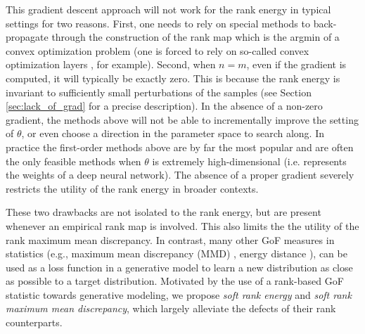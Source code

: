 \documentclass{article}
\theoremstyle{definition}
\begin{document}
This gradient descent approach will not work for the rank energy in typical settings for two reasons. First, one needs to rely on special methods to back-propagate through the construction of the rank map which is the argmin of a convex optimization problem (one is forced to rely on so-called convex optimization layers \cite{agrawal2019differentiable}, for example). Second, when $n = m$, even if the gradient is computed, it will typically be exactly zero. This is because the rank energy is invariant to sufficiently small perturbations of the samples (see Section \ref{sec:lack_of_grad} for a precise description). In the absence of a non-zero gradient, the methods above will not be able to incrementally improve the setting of $\theta$, or even choose a direction in the parameter space to search along. In practice the first-order methods above are by far the most popular and are often the only feasible methods when $\theta$ is extremely high-dimensional (i.e. represents the weights of a deep neural network). The absence of a proper gradient severely restricts the utility of the rank energy in broader contexts. 

These two drawbacks are not isolated to the rank energy, but are present whenever an empirical rank map is involved. This  also limits the the utility of the rank maximum mean discrepancy. In contrast, many other GoF measures in statistics (e.g., maximum mean discrepancy (MMD) \cite{li2015generative}, energy distance \cite{bellemare2017cramer}), can be used as a loss function in a generative model to learn a new distribution as close as possible to a target distribution. Motivated by the use of a rank-based GoF statistic towards generative modeling, we propose \textit{soft rank energy} and \textit{soft rank maximum mean discrepancy}, which largely alleviate the defects of their rank counterparts.
\end{document}
